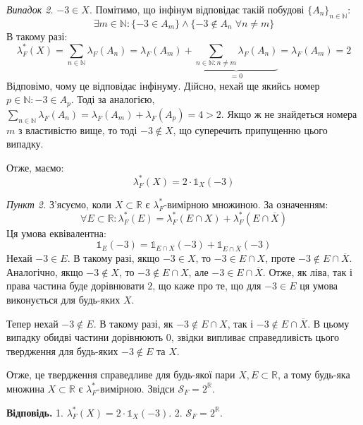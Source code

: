 \documentclass[14pt]{extarticle}
\begin{document}
\textit{Випадок 2.} $-3 \in X$. Помітимо, що інфінум відповідає такій побудові $\{A_n\}_{n \in \mathbb{N}}$:
\[
\exists m \in \mathbb{N}: \{-3 \in A_m\} \wedge \{-3 \not \in A_n \; \forall n \neq m\} 
\]
В такому разі:
\[
\lambda_F^*(X) = \sum_{n \in \mathbb{N}} \lambda_F(A_n)=\lambda_F(A_m) + \underbrace{\sum_{n \in \mathbb{N}: n \neq m}\lambda_F(A_n)}_{=0} = \lambda_F(A_m) = 2
\]
Відповімо, чому це відповідає інфінуму. Дійсно, нехай ще якийсь номер $p \in \mathbb{N}: -3 \in A_p$. Тоді за аналогією, $\sum_{n \in \mathbb{N}}\lambda_F(A_n) = \lambda_F(A_m)+\lambda_F(A_p)=4 > 2$. Якщо ж не знайдеться номера $m$ з властивістю вище, то тоді $-3 \not\in X$, що суперечить припущенню цього випадку. 

Отже, маємо:
\[
\lambda_F^*(X) = 2 \cdot \mathds{1}_X(-3)
\]

\textit{Пункт 2.} З'ясуємо, коли $X \subset \mathbb{R}$ є $\lambda_F^*$-вимірною множиною. За означенням:
\[
\forall E \subset \mathbb{R}: \lambda_F^*(E) = \lambda_F^*(E \cap X) + \lambda_F^*(E \cap \overline{X})
\]
Ця умова еквівалентна:
\[
\mathds{1}_E(-3) = \mathds{1}_{E \cap X}(-3) + \mathds{1}_{E \cap \overline{X}}(-3)
\]
Нехай $-3 \in E$. В такому разі, якщо $-3 \in X$, то $-3 \in E \cap X$, проте $-3 \not \in E \cap \overline{X}$. Аналогічно, якщо $-3 \not\in X$, то $-3 \not \in E \cap X$, але $-3 \in E \cap \overline{X}$. Отже, як ліва, так і права частина буде дорівнювати $2$, що каже про те, що для $-3 \in E$ ця умова виконується для будь-яких $X$.

Тепер нехай $-3 \not\in E$. В такому разі, як $-3 \not\in E \cap X$, так і $-3 \not\in E \cap \overline{X}$. В цьому випадку обидві частини дорівнюють $0$, звідки випливає справедливість цього твердження для будь-яких $-3 \not\in E$ та $X$. 

Отже, це твердження справедливе для будь-якої пари $X,E \subset \mathbb{R}$, а тому будь-яка множина $X \subset \mathbb{R}$ є $\lambda_F^*$-вимірною. Звідси $\mathcal{S}_F = 2^{\mathbb{R}}$.

\textbf{Відповідь.} 1. $\lambda_F^*(X) = 2 \cdot \mathds{1}_X(-3)$. 2. $\mathcal{S}_F=2^{\mathbb{R}}$.
\end{document}
